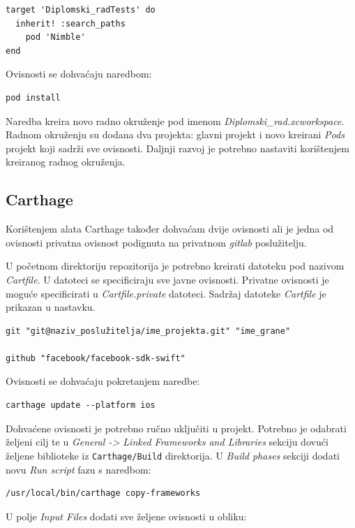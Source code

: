 \documentclass[times, utf8, diplomski, numeric]{fer}
\begin{document}
\begin{appendices}
\begin{verbatim}
target 'Diplomski_radTests' do
  inherit! :search_paths
    pod 'Nimble'
end
\end{verbatim}

Ovisnosti se dohvaćaju naredbom:

\begin{verbatim}
pod install
\end{verbatim}

Naredba kreira novo radno okruženje pod imenom \textit{Diplomski\_rad.xcworkspace}. Radnom okruženju su dodana dva projekta: glavni projekt i novo kreirani \textit{Pods} projekt koji sadrži sve ovisnosti. Daljnji razvoj je potrebno nastaviti korištenjem kreiranog radnog okruženja.

\subsection{Carthage}

Korištenjem alata Carthage također dohvaćam dvije ovisnosti ali je jedna od ovisnosti privatna ovisnost podignuta na privatnom \textit{gitlab} poslužitelju.

U početnom direktoriju repozitorija je potrebno kreirati datoteku pod nazivom \textit{Cartfile}. U datoteci se specificiraju sve javne ovisnosti. Privatne ovisnosti je moguće specificirati u \textit{Cartfile.private} datoteci. Sadržaj datoteke \textit{Cartfile} je prikazan u nastavku.

\begin{verbatim}
git "git@naziv_poslužitelja/ime_projekta.git" "ime_grane"

github "facebook/facebook-sdk-swift"
\end{verbatim}

Ovisnosti se dohvaćaju pokretanjem naredbe:

\begin{verbatim}
carthage update --platform ios
\end{verbatim}

Dohvaćene ovisnosti je potrebno ručno uključiti u projekt. Potrebno je odabrati željeni cilj te u \textit{General -> Linked Frameworks and Libraries} sekciju dovući željene biblioteke iz \verb|Carthage/Build| direktorija. U \textit{Build phases} sekciji dodati novu \textit{Run script} fazu s naredbom:

\begin{verbatim}
/usr/local/bin/carthage copy-frameworks
\end{verbatim}

U polje \textit{Input Files} dodati sve željene ovisnosti u obliku:


\end{appendices}
\end{document}
